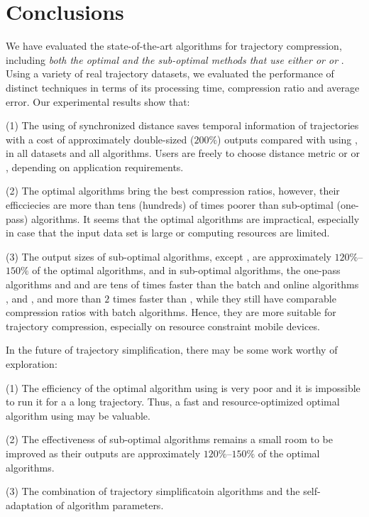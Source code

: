\vspace{-1ex}
\section{Conclusions}

We have evaluated the state-of-the-art \lsa algorithms for trajectory compression, including \emph{both the optimal and the sub-optimal methods that use either \ped or \sed or \dad}. 
Using a variety of real trajectory datasets, we evaluated the performance of distinct techniques in terms of its processing time, compression ratio and average error.
Our experimental results show that: 

(1) The using of synchronized distance \sed saves temporal information of trajectories with a cost of approximately double-sized (\ie $200\%$) outputs compared with using \ped, in all datasets and all algorithms. 
Users are freely to choose distance metric \sed or \ped or \dad, depending on application requirements.

(2) The optimal algorithms bring the best compression ratios, however, their efficciecies are more than tens (hundreds) of times poorer than sub-optimal (one-pass) algorithms. It seems that the optimal algorithms are impractical, especially in case that the input data set is large or computing resources are limited.

(3) The output sizes of sub-optimal algorithms, except \squishe, are approximately $120\%$--$150\%$ of the optimal algorithms, and in sub-optimal algorithms, the one-pass algorithms \siped and \operb and \cised are tens of times faster than the batch and online algorithms \tpa, \dpa and \bqsa, and more than $2$ times faster than \squishe, while they still have comparable compression ratios with batch algorithms. Hence, they are more suitable for trajectory compression, especially on resource constraint mobile devices.

In the future of trajectory simplification, there may be some work worthy of exploration:

(1) The efficiency of the optimal algorithm using \sed is very poor and it is impossible to run it for a a long trajectory. Thus, a fast and resource-optimized optimal algorithm using \sed may be valuable.

(2) The effectiveness of sub-optimal algorithms remains a small room to be improved as their outputs are approximately $120\%$--$150\%$ of the optimal algorithms.

(3) The combination of trajectory simplificatoin algorithms and the self-adaptation of algorithm parameters.

